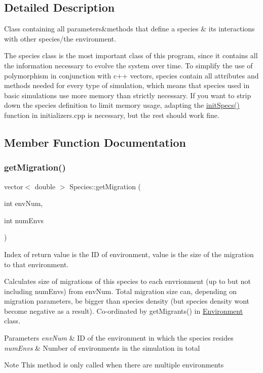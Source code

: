 \subsection{Detailed Description}
Class containing all parameters\&methods that define a species \& it\textquotesingle{}s interactions with other species/the environment. 

The species class is the most important class of this program, since it contains all the information necessary to evolve the system over time. To simplify the use of polymorphism in conjunction with c++ vectors, species contain all attributes and methods needed for every type of simulation, which means that species used in basic simulations use more memory than strictly necessary. If you want to strip down the species definition to limit memory usage, adapting the \hyperlink{initializers_8hpp_a1a78967080f9ce44c5062094c6495078}{init\+Specs()} function in initializers.\+cpp is necessary, but the rest should work fine. 

\subsection{Member Function Documentation}
\mbox{\label{classSpecies_a306aaa396cc99e223d46a577b14e1faf}} 
\subsubsection{\texorpdfstring{get\+Migration()}{getMigration()}}
{\footnotesize\ttfamily vector$<$ double $>$ Species\+::get\+Migration (\begin{DoxyParamCaption}\item[{int}]{env\+Num,  }\item[{int}]{num\+Envs }\end{DoxyParamCaption})}



Index of return value is the ID of environment, value is the size of the migration to that environment. 

Calculates size of migrations of this species to each envrionment (up to but not including num\+Envs) from env\+Num. Total migration size can, depending on migration parameters, be bigger than species density (but species density won\textquotesingle{}t become negative as a result). Co-\/ordinated by get\+Migrants() in \hyperlink{classEnvironment}{Environment} class. 
\begin{DoxyParams}{Parameters}
{\em env\+Num} & ID of the environment in which the species resides \\
\hline
{\em num\+Envs} & Number of environments in the simulation in total \\
\hline
\end{DoxyParams}
\begin{DoxyNote}{Note}
This method is only called when there are multiple environments 
\end{DoxyNote}



